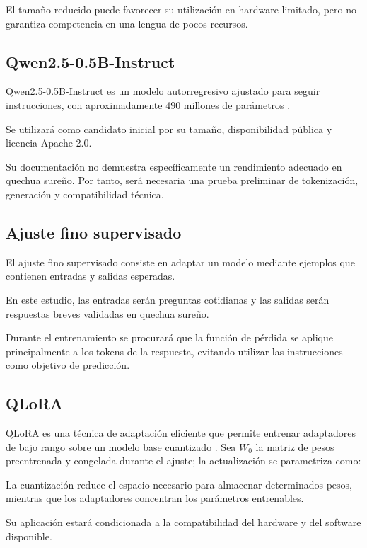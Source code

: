 El tamaño reducido puede favorecer su utilización en hardware limitado, pero no garantiza competencia en una lengua de pocos recursos.

\subsection{Qwen2.5-0.5B-Instruct}\label{qwen25-05b-instruct}

Qwen2.5-0.5B-Instruct es un modelo autorregresivo ajustado para seguir instrucciones, con aproximadamente 490 millones de parámetros \parencite{QwenCard2024}.

Se utilizará como candidato inicial por su tamaño, disponibilidad pública y licencia Apache 2.0.

Su documentación no demuestra específicamente un rendimiento adecuado en quechua sureño. Por tanto, será necesaria una prueba preliminar de tokenización, generación y compatibilidad técnica.

\subsection{Ajuste fino supervisado}\label{ajuste-fino-supervisado}

El ajuste fino supervisado consiste en adaptar un modelo mediante ejemplos que contienen entradas y salidas esperadas.

En este estudio, las entradas serán preguntas cotidianas y las salidas serán respuestas breves validadas en quechua sureño.

Durante el entrenamiento se procurará que la función de pérdida se aplique principalmente a los tokens de la respuesta, evitando utilizar las instrucciones como objetivo de predicción.

\subsection{QLoRA}\label{qlora}

QLoRA es una técnica de adaptación eficiente que permite entrenar adaptadores de bajo rango sobre un modelo base cuantizado \parencite{Dettmers2023}. Sea $W_0$ la matriz de pesos preentrenada y congelada durante el ajuste; la actualización se parametriza como:

La cuantización reduce el espacio necesario para almacenar determinados pesos, mientras que los adaptadores concentran los parámetros entrenables.

Su aplicación estará condicionada a la compatibilidad del hardware y del software disponible.

